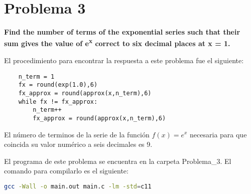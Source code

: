 \section*{Problema 3}
\textbf{Find the number of terms of the exponential series such that their sum gives the value of e\textsuperscript{x} correct to six decimal places at x = 1.}

El procedimiento para encontrar la respuesta a este problema fue el siguiente:
\begin{lstlisting}
    n_term = 1
    fx = round(exp(1.0),6)
    fx_approx = round(approx(x,n_term),6)
    while fx != fx_approx:
        n_term++
        fx_approx = round(approx(x,n_term),6)
\end{lstlisting}

El número de terminos de la serie de la función $f(x)=e^x$ necesaria para que coincida su valor numérico a seis decimales es 9.

El programa de este problema se encuentra en la carpeta \textcolor{citecolor}{Problema\_3}. El comando para compilarlo es el siguiente:

\begin{lstlisting}[language=bash]
    gcc -Wall -o main.out main.c -lm -std=c11
\end{lstlisting}